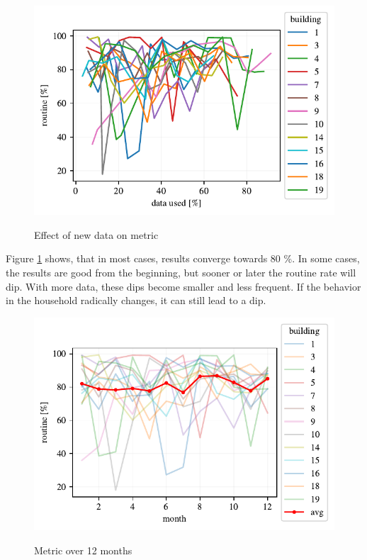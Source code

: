 \begin{figure}[H]
	\centering
	\caption{Effect of new data on metric}
	\includegraphics[]{Figures/EC/DYN/efect_of_data_on_metric.pdf}
	\label{fig:efect_of_data_on_metric}
\end{figure}

Figure \ref{fig:efect_of_data_on_metric} shows, that in most cases, results converge towards 80 \%. 
In some cases, the results are good from the beginning, but sooner or later the routine rate will dip. 
With more data, these dips become smaller and less frequent. 
If the behavior in the household radically changes, it can still lead to a dip.

\begin{figure}[H]
	\centering
	\caption{Metric over 12 months}
	\includegraphics[]{Figures/EC/DYN/1_year_of_iterative_learning_avg.pdf}
	\label{fig:1_year_of_iterative_learning_avg}
\end{figure}

